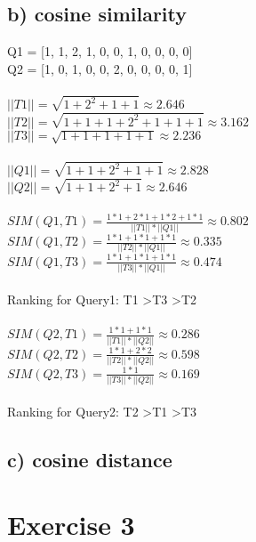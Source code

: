 \documentclass{article}
\begin{document}
\subsection*{b) cosine similarity }
Q1 = [1, 1, 2, 1, 0, 0, 1, 0, 0, 0, 0]\\
Q2 = [1, 0, 1, 0, 0, 2, 0, 0, 0, 0, 1]\\
\\
$ || T1 || = \sqrt{1 +2^2 + 1 +1} \approx 2.646$\\
$ || T2 || = \sqrt{1 + 1 + 1 + 2^2 + 1 + 1 + 1} \approx 3.162$\\
$ || T3 || = \sqrt{1 + 1 + 1 + 1 + 1} \approx 2.236$\\
\\
$ || Q1 || = \sqrt{1 + 1 + 2^2 + 1 + 1} \approx 2.828$\\
$ || Q2 || = \sqrt{1 + 1 + 2^2 + 1} \approx 2.646$\\
\vspace{0.5cm}
\\
$SIM(Q1, T1) = \frac{1*1 + 2*1 + 1*2 + 1*1}{|| T1 || * || Q1 ||} \approx
0.802$\\
$SIM(Q1, T2) = \frac{1*1 + 1*1 + 1*1}{|| T2 || * || Q1 ||} \approx 0.335 $\\
$SIM(Q1, T3) = \frac{1*1 + 1*1 + 1*1}{|| T3 || * || Q1 ||} \approx 0.474 $\\
\\
Ranking for Query1: T1 \textgreater T3 \textgreater T2\\
\\
$SIM(Q2, T1) = \frac{1*1 + 1*1}{|| T1 || * || Q2 ||} \approx 0.286 $\\
$SIM(Q2, T2) = \frac{1*1 + 2*2}{|| T2 || * || Q2 ||} \approx 0.598 $\\
$SIM(Q2, T3) = \frac{1*1}{|| T3 || * || Q2 ||} \approx 0.169 $\\
\\
Ranking for Query2: T2 \textgreater T1 \textgreater T3\\

\subsection*{c) cosine distance}


\vspace{2cm}
\section*{Exercise 3}
\end{document}
